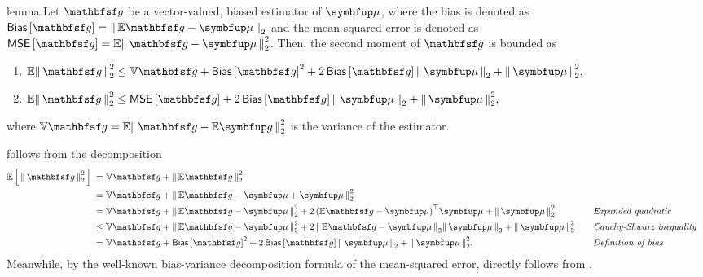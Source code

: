 \begin{theoremEnd}{lemma}\label{thm:second_moment_bound}
  Let \(\rvvg\) be a vector-valued, biased estimator of \(\vmu\), where the bias is denoted as \(\mathsf{Bias}\left[\rvvg\right] = \norm{ \mathbb{E}\rvvg - \vmu }_2\) and the mean-squared error is denoted as \(\mathsf{MSE}\left[\rvvg\right] = \mathbb{E}\norm{\rvvg - \vmu }_2^2\).
  Then, the second moment of \(\rvvg\) is bounded as
  \begin{enumerate}
  \item[\ding{182}]
  \(
    \mathbb{E}\norm{\rvvg}^2_2
    \leq
    \mathbb{V}{\rvvg} + {\mathsf{Bias}\left[\rvvg\right]}^2 + 2\, \mathsf{Bias}\left[\rvvg\right] \norm{\vmu}_2 + \norm{\vmu}^2_2,
  \)
  \item[\ding{183}]
  \(
    \mathbb{E}\norm{\rvvg}^2_2 
    \leq
    \mathsf{MSE}\left[{\rvvg}\right] + 2\, \mathsf{Bias}\left[\rvvg\right] \norm{\vmu}_2 + \norm{\vmu}^2_2,
  \)
  \end{enumerate}
  where \(\mathbb{V}\rvvg = \mathbb{E}\norm{ \rvvg - \mathbb{E}\vg}_2^2\) is the variance of the estimator.
\end{theoremEnd}
\begin{proofEnd}
   follows from the decomposition
  {%
  \begin{alignat}{2}
    \E{ \norm{\rvvg}^2_{2} }
    &\;=
    \mathbb{V}{ \rvvg }
    +
    \norm{ \mathbb{E}{ \rvvg } }_2^2
    \nonumber
    \\
    &\;=
    \mathbb{V}{ \rvvg }
    +
    \norm{
      \mathbb{E}{ \rvvg } - \vmu  + \vmu
    }_2^2
    \nonumber
    \\
    &\;=
    \mathbb{V}{ \rvvg }
    +
    \norm{
      \mathbb{E}{ \rvvg } - \vmu  
    }_2^2
    \nonumber
    +
    2 \, {\left(
      \mathbb{E}\rvvg - \vmu 
    \right)}^{\top}
    \vmu
    + 
    \norm{\vmu}^2_2
    &&\quad\text{\textit{Expanded quadratic}}
    \nonumber
    \\
    &\;\leq
    \mathbb{V}{ \rvvg }
    +
    \norm{
      \mathbb{E}{ \rvvg   } - \vmu 
    }_2^2
    +
    2 \,\norm{
      \mathbb{E}{ \rvvg  } - \vmu
    }_2
    \norm{\vmu}_2
    + 
    \norm{
      \vmu
    }_2^2
    \nonumber
    &&\quad\text{\textit{Cauchy-Shwarz inequality}}
    \\
    &\;=
    \mathbb{V}{ \rvvg  }
    +
    {\mathsf{Bias}\left[\rvvg\right]}^2
    +
    2 \,\mathsf{Bias}\left[\rvvg\right]
    \norm{\vmu}_2
    + 
    \norm{
      \vmu
    }_2^2.
    \nonumber
    &&\quad\text{\textit{Definition of bias}}
  \end{alignat}
  }
  Meanwhile, by the well-known bias-variance decomposition formula of the mean-squared error,  directly follows from .
\end{proofEnd}

